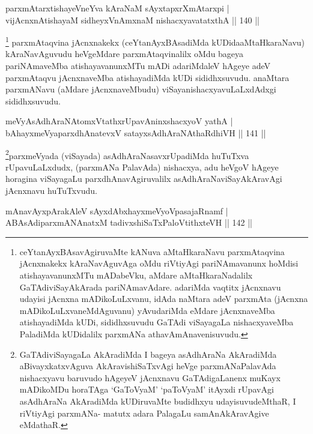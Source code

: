 \begin{shl}
parxmAtarxtishayeVneYva kAraNaM sAyxtapxrXmAtarxpi |\\
vijAcnxnAtishayaM sidheyxVnAmxnaM nishacxyavatatxthA \hfill || 140 ||
\end{shl}

\begin{artha}%
\footnote{ceYtanAyxBAsavAgiruvaMte kANuva aMtaHkaraNavu parxmAtaqvina jAcnxnakekx kAraNavAguvAga oMdu riVtiyAgi pariNAmavanunx hoMdisi atishayavanunxMTu mADabeVku, aMdare aMtaHkaraNadalilx GaTAdiviSayAkArada pariNAmavAdare. adariMda vaqtitx jAcnxnavu udayisi jAcnxna mADikoLuLxvanu, idAda naMtara adeV parxmAta (jAcnxna mADikoLuLxvaneMdAguvanu) yAvudariMda eMdare jAcnxnaveMba atishayadiMda kUDi, sididhxsuvudu GaTAdi viSayagaLa nishacxyaveMba PaladiMda kUDidalilx parxmANa athavA\break mAnavenisuvudu.} parxmAtaqvina jAcnxnakekx (ceYtanAyxBAsadiMda kUDida\break aMtaHkaraNavu) kAraNavAguvudu heVgeMdare parxmAtaqvinalilx oMdu bageya pariNAmaveMba  atishayavanunxMTu mADi adariMdaleV hAgeye adeV parxmAtaqvu jAcnxnaveMba atishayadiMda kUDi sididhxsuvudu. anaMtara parxmANavu (aMdare jAcnxnaveMbudu) viSayanishacxyavuLaLxdAdxgi sididhxsuvudu.
\end{artha}


\begin{shl}
meVyAsAdhAraNAtomxVtathxrUpavAninxshacxyoV yathA |\\
bAhayxmeVyaparxdhAnatevxV satayxsAdhAraNAthaRdhiVH \hfill || 141 ||
\end{shl}

\begin{artha}
\footnote{GaTAdiviSayagaLa AkAradiMda I bageya asAdhAraNa AkAradiMda aBivayxkatxvAguva AkAravishiSaTxvAgi heVge parxmANaPalavAda nishacxyavu baruvudo hAgeyeV jAcnxnavu GaTAdigaLanenx muKayx mADikoMDu horaTAga `GaToV\s yaM' `paToV\s yaM' itAyxdi rUpavAgi asAdhAraNa AkAradiMda kUDiruvaMte budidhxyu udayisuvudeMthaR, I riVtiyAgi parxmANa- matutx adara PalagaLu samAnAkAravAgive eMdathaR.}parxmeVyada (viSayada) asAdhAraNasavxrUpadiMda huTuTxva rUpavuLaLxdudx, (parxmANa PalavAda) nishacxya, adu heVgoV hAgeye horagina viSayagaLu parxdhAnavAgiruvalilx asAdhAraNaviSayAkAravAgi jAcnxnavu huTuTxvudu.
\end{artha}


\begin{shl}
mAnavAyxpArakAleV sAyxdAbxhayxmeVyoVpasajaRnamf |\\
ABAsAdiparxmANAnatxM tadivxshiSaTxPaloVtithxteVH \hfill || 142 ||
\end{shl}

